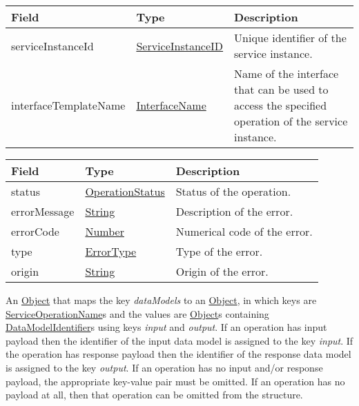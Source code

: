 \documentclass[a4paper]{arrowhead}
\newcommand{\pref}[1]{{\textcolor{ArrowheadGrey}{\hyperref[sec:model:primitives:#1]{#1}}}}
\begin{document}
\clearpage


\begin{table}[ht!]
\begin{tabularx}{\textwidth}{| p{4.25cm} | p{6.1cm} | X |} \hline
\rowcolor{gray!33} Field & Type      & Description \\ \hline
serviceInstanceId & \pref{ServiceInstanceID} & Unique identifier of the service ins\-tance. \\ \hline
interfaceTemplateName & \pref{InterfaceName} & Name of the interface that can be used to access the specified operation of the service instance. \\ \hline
\end{tabularx}
\end{table}


\begin{table}[ht!]
\begin{tabularx}{\textwidth}{| p{4.25cm} | p{3.5cm} | X |} \hline
\rowcolor{gray!33} Field & Type      & Description \\ \hline
status & \pref{OperationStatus} & Status of the operation. \\ \hline
errorMessage & \pref{String} & Description of the error. \\ \hline
errorCode &\pref{Number}  & Numerical code of the error. \\ \hline
type & \pref{ErrorType} & Type of the error. \\ \hline
origin & \pref{String} & Origin of the error. \\ \hline
\end{tabularx}
\end{table}


An \pref{Object} that maps the key \textit{dataModels} to an \pref{Object}, in which keys are \pref{ServiceOperationName}s and the values are \pref{Object}s containing \pref{DataModelIdentifier}s using keys \textit{input} and \textit{output}. If an operation has input payload then the identifier of the input data model is assigned to the key \textit{input}. If the operation has response payload then the identifier of the response data model is assigned to the key \textit{output}. If an operation has no input and/or response payload, the appropriate key-value pair must be omitted. If an operation has no payload at all, then that operation can be omitted from the structure.
\end{document}
